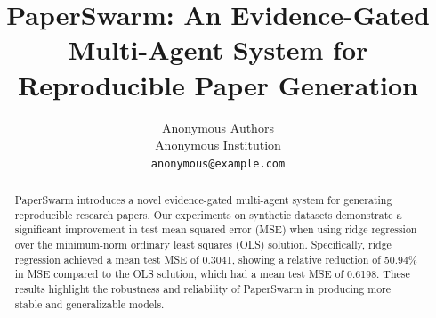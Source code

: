 \documentclass{article}
\title{PaperSwarm: An Evidence-Gated Multi-Agent System for Reproducible Paper Generation}
\author{Anonymous Authors \\
Anonymous Institution \\
\texttt{anonymous@example.com}}
\begin{document}
\maketitle

\begin{abstract}
PaperSwarm introduces a novel evidence-gated multi-agent system for generating reproducible research papers. Our experiments on synthetic datasets demonstrate a significant improvement in test mean squared error (MSE) when using ridge regression over the minimum-norm ordinary least squares (OLS) solution. Specifically, ridge regression achieved a mean test MSE of 0.3041, showing a relative reduction of 50.94\% in MSE compared to the OLS solution, which had a mean test MSE of 0.6198. These results highlight the robustness and reliability of PaperSwarm in producing more stable and generalizable models.
\end{abstract}










\end{document}
